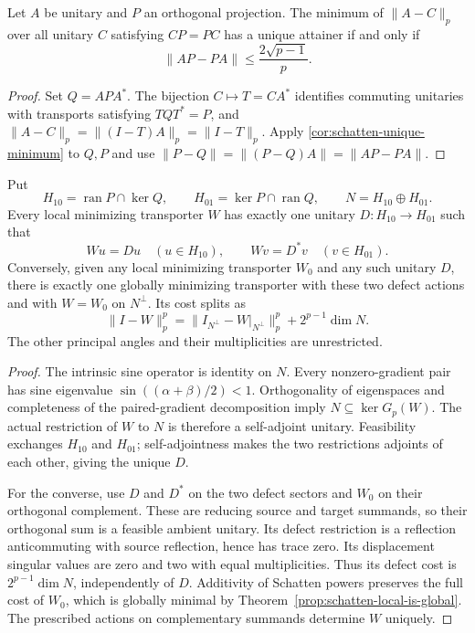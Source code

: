 \begin{corollary}
\label{cor:schatten-commutator-uniqueness}
Let $A$ be unitary and $P$ an orthogonal projection. The minimum of
$\|A-C\|_p$ over all unitary $C$ satisfying $CP=PC$ has a unique
attainer if and only if
\[
 \|AP-PA\|\leq\frac{2\sqrt{p-1}}p.
\]
\end{corollary}

\begin{proof}
Set $Q=APA^*$. The bijection $C\mapsto T=CA^*$ identifies commuting
unitaries with transports satisfying $TQT^*=P$, and
$\|A-C\|_p=\|(I-T)A\|_p=\|I-T\|_p$.
Apply \cref{cor:schatten-unique-minimum} to $Q,P$ and use
$\|P-Q\|=\|(P-Q)A\|=\|AP-PA\|$.
\end{proof}

\begin{proposition}
\label{prop:schatten-all-right-defects}
Put
\[
 H_{10}=\operatorname{ran}P\cap\ker Q,\qquad
 H_{01}=\ker P\cap\operatorname{ran}Q,\qquad
 N=H_{10}\oplus H_{01}.
\]
Every local minimizing transporter $W$ has exactly one unitary
$D:H_{10}\to H_{01}$ such that
\[
 Wu=Du\quad(u\in H_{10}),\qquad
 Wv=D^*v\quad(v\in H_{01}).
\]
Conversely, given any local minimizing transporter $W_0$ and any such
unitary $D$, there is exactly one globally minimizing transporter with
these two defect actions and with $W=W_0$ on $N^\perp$. Its cost splits as
\[
 \|I-W\|_p^p
   =\|I_{N^\perp}-W|_{N^\perp}\|_p^p
       +2^{p-1}\dim N.
\]
The other principal angles and their multiplicities are unrestricted.
\end{proposition}

\begin{proof}
The intrinsic sine operator is identity on $N$.
Every nonzero-gradient pair has sine eigenvalue
$\sin((\alpha+\beta)/2)<1$. Orthogonality of eigenspaces and
completeness of the paired-gradient decomposition imply
$N\subseteq\ker G_p(W)$. The actual restriction of $W$ to $N$ is
therefore a self-adjoint unitary. Feasibility exchanges $H_{10}$ and
$H_{01}$; self-adjointness makes the two restrictions adjoints of each other,
giving the unique $D$.

For the converse, use $D$ and $D^*$ on the two defect sectors and
$W_0$ on their orthogonal complement. These are reducing source and
target summands, so their orthogonal sum is a feasible ambient unitary.
Its defect restriction is a reflection anticommuting with source
reflection, hence has trace zero. Its displacement singular values
are zero and two with equal multiplicities. Thus its defect cost is
$2^{p-1}\dim N$, independently of $D$. Additivity of Schatten powers
preserves the full cost of $W_0$, which is globally minimal by
Theorem~\ref{prop:schatten-local-is-global}. The prescribed actions
on complementary summands determine $W$ uniquely.
\end{proof}

